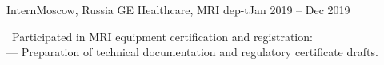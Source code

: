     \resumeSubheading
      {Intern}{Moscow, Russia}
      {GE Healthcare, MRI dep-t}{Jan 2019 -- Dec 2019}
      \begin{itemize}[leftmargin=0in, label={}]
            \small{\item{
                \textbullet \ {Participated in MRI equipment certification and registration:}\\
                {— Preparation of technical documentation and regulatory certificate drafts.}\\
            }}
      \end{itemize}
